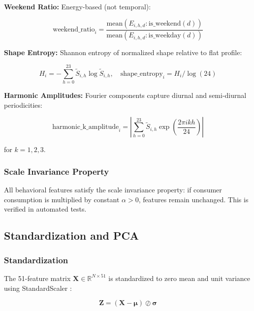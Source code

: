 \documentclass[11pt,a4paper]{article}
\begin{document}
\textbf{Weekend Ratio:} Energy-based (not temporal):

\begin{equation}
\text{weekend\_ratio}_i = \frac{\text{mean}(E_{i,h,d} : \text{is\_weekend}(d))}{\text{mean}(E_{i,h,d} : \text{is\_weekday}(d))}
\end{equation}

\textbf{Shape Entropy:} Shannon entropy of normalized shape relative to flat profile:

\begin{equation}
H_i = -\sum_{h=0}^{23} \tilde{S}_{i,h} \log \tilde{S}_{i,h}, \quad
\text{shape\_entropy}_i = H_i / \log(24)
\end{equation}

\textbf{Harmonic Amplitudes:} Fourier components capture diurnal and semi-diurnal periodicities:

\begin{equation}
\text{harmonic\_k\_amplitude}_i = \left| \sum_{h=0}^{23} \tilde{S}_{i,h} \exp\left(\frac{2\pi i k h}{24}\right) \right|
\end{equation}

for $k = 1, 2, 3$.

\subsubsection{Scale Invariance Property}

All behavioral features satisfy the scale invariance property: if consumer consumption is multiplied by constant $\alpha > 0$, features remain unchanged. This is verified in automated tests.

\subsection{Standardization and PCA}
\label{sec:pca}

\subsubsection{Standardization}

The 51-feature matrix $\mathbf{X} \in \mathbb{R}^{N \times 51}$ is standardized to zero mean and unit variance using StandardScaler \cite{pedregosa2011scikit}:

\begin{equation}
\mathbf{Z} = (\mathbf{X} - \boldsymbol{\mu}) \oslash \boldsymbol{\sigma}
\end{equation}
\end{document}
